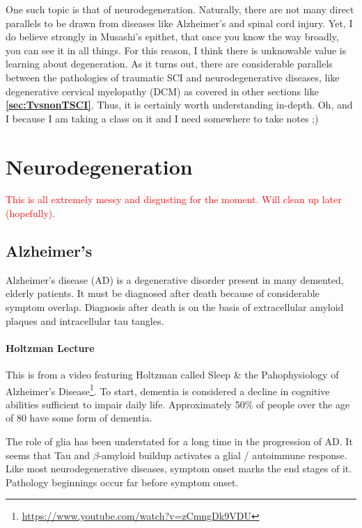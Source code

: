 \documentclass[12pt]{report}
\begin{document}
One such topic is that of neurodegeneration. Naturally, there are not many direct parallels to be drawn from diseases like Alzheimer's and spinal cord injury. Yet, I do believe strongly in Musashi's epithet, that once you know the way broadly, you can see it in all things. For this reason, I think there is unknowable value is learning about degeneration. As it turns out, there are considerable parallels between the pathologies of traumatic SCI and neurodegenerative diseases, like degenerative cervical myelopathy (DCM) as covered in other sections like \textbf{\ref{sec:TvsnonTSCI}}. Thus, it is certainly worth understanding in-depth. Oh, and I because I am taking a class on it and I need somewhere to take notes ;) 

\chapter*{Neurodegeneration}

\textcolor{red}{This is all extremely messy and disgusting for the moment. Will clean up later (hopefully).}

\section*{Alzheimer's}

Alzheimer's disease (AD) is a degenerative disorder present in many demented, elderly patients. It must be diagnosed after death because of considerable symptom overlap. Diagnosis after death is on the basis of extracellular amyloid plaques and intracellular tau tangles. 

\subsubsection*{Holtzman Lecture} This is from a video featuring Holtzman called Sleep \& the Pahophysiology of Alzheimer's Disease\footnote{\url{https://www.youtube.com/watch?v=zCmngDk9VDU}}. To start, dementia is considered a decline in cognitive abilities sufficient to impair daily life. Approximately 50\% of people over the age of 80 have some form of dementia.\newline

The role of glia has been understated for a long time in the progression of AD. It seems that Tau and $\beta$-amyloid buildup activates a glial / autoimmune response. Like most neurodegenerative diseases, symptom onset marks the end stages of it. Pathology beginnings occur far before symptom onset.\newline
\end{document}
